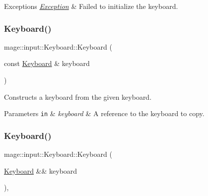 \begin{DoxyExceptions}{Exceptions}
{\em \mbox{\hyperlink{classmage_1_1_exception}{Exception}}} & Failed to initialize the keyboard. \\
\hline
\end{DoxyExceptions}
\mbox{\label{classmage_1_1input_1_1_keyboard_ae7297c3080b0e6f78e37cf94ce3effcb}} 
\subsubsection{\texorpdfstring{Keyboard()}{Keyboard()}\hspace{0.1cm}{\footnotesize\ttfamily [2/3]}}
{\footnotesize\ttfamily mage\+::input\+::\+Keyboard\+::\+Keyboard (\begin{DoxyParamCaption}\item[{const \mbox{\hyperlink{classmage_1_1input_1_1_keyboard}{Keyboard}} \&}]{keyboard }\end{DoxyParamCaption})\hspace{0.3cm}{\ttfamily [delete]}}

Constructs a keyboard from the given keyboard.


\begin{DoxyParams}[1]{Parameters}
\mbox{\tt in}  & {\em keyboard} & A reference to the keyboard to copy. \\
\hline
\end{DoxyParams}
\mbox{\label{classmage_1_1input_1_1_keyboard_adb93a42b959d58fc320215157f85854c}} 
\subsubsection{\texorpdfstring{Keyboard()}{Keyboard()}\hspace{0.1cm}{\footnotesize\ttfamily [3/3]}}
{\footnotesize\ttfamily mage\+::input\+::\+Keyboard\+::\+Keyboard (\begin{DoxyParamCaption}\item[{\mbox{\hyperlink{classmage_1_1input_1_1_keyboard}{Keyboard}} \&\&}]{keyboard }\end{DoxyParamCaption})\hspace{0.3cm}{\ttfamily [default]}, {\ttfamily [noexcept]}}

